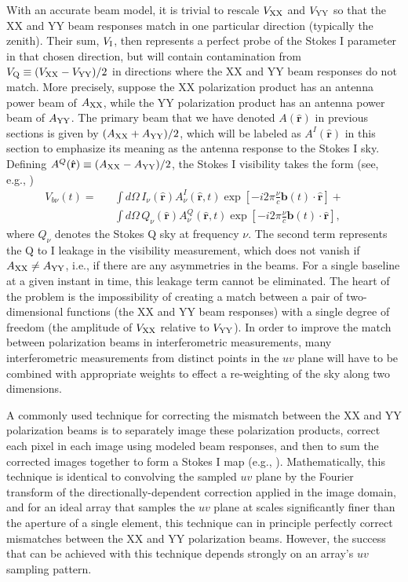 \documentclass[twocolumn,apj,numberedappendix]{emulateapj}
\newcommand{\rhat}{\hat{\mathbf{r}}}
\begin{document}
With an accurate beam model, it is trivial to rescale ${V_{\rm XX}}$ and ${V_{\rm YY}}$ 
so that the XX and YY beam responses match in one particular direction (typically the zenith).  Their sum, ${V_{\rm I}}$, then
represents a perfect probe of the Stokes I parameter in that chosen direction, but will contain contamination
from ${V_{\rm Q}}\equiv({V_{\rm XX}}-{V_{\rm YY}})/2$ in directions where the XX and YY beam responses do not match.
More precisely, suppose the XX polarization product has an antenna power beam of $A_{\rm XX}$, while the YY 
polarization product has an antenna power beam of $A_{\rm YY}$. The primary beam that we have denoted $A(\rhat)$ 
in previous sections is given by $(A_{\rm XX} + A_{\rm YY})/2$, which will be labeled as $A^I(\rhat)$ in this section to emphasize
its meaning as the antenna response to the Stokes I sky. Defining $A^Q(\rhat) \equiv (A_{\rm XX} - A_{\rm YY})/2$, the
Stokes I visibility takes the form (see, e.g., \citealt{moore_et_al2015})
\begin{eqnarray}
V_{b\nu}(t)= &&\int d\Omega \, {I_\nu(\rhat) A^I_\nu(\rhat,t) \exp \left[-i2\pi \frac{\nu}{c}  \mathbf{b}(t) \cdot \rhat\right]} + \nonumber \\
&& \int d\Omega \, {Q_\nu(\rhat) A^Q_\nu(\rhat,t) \exp \left[-i2\pi \frac{\nu}{c}  \mathbf{b}(t) \cdot \rhat\right]}, \qquad
\end{eqnarray}
where $Q_\nu$ denotes the Stokes Q sky at frequency $\nu$. The second term represents the Q to I leakage
in the visibility measurement, which does not vanish if $ A_{\rm XX} \neq A_{\rm YY}$, i.e., if there are
any asymmetries in the beams. For a single baseline at a given instant in time, this leakage term
cannot be eliminated. The heart of the problem is the impossibility of creating a match between a pair of two-dimensional functions (the
XX and YY beam responses) with a single degree of freedom (the amplitude of ${V_{\rm XX}}$ relative to ${V_{\rm YY}}$).  In order
to improve the match between polarization beams in interferometric measurements, many interferometric measurements
from distinct points in the $uv$ plane will have to be combined with appropriate weights to effect a re-weighting
of the sky along two dimensions.

A commonly used technique for correcting the mismatch between the XX and YY polarization beams is to separately
image these polarization products, correct each pixel in each image using modeled beam responses,
and then to sum the corrected images together to form a Stokes I map 
(e.g., \citealt{sullivan_et_al2012,bernardi_et_al2013,asad_et_al2015}).  Mathematically, this technique is identical to convolving the sampled
$uv$ plane by the Fourier transform of the directionally-dependent correction applied in the image domain, and for an ideal
array that samples the $uv$ plane at scales significantly finer than the aperture of a single element, this technique can
in principle perfectly correct mismatches between the XX and YY polarization beams.
However, the success that can be achieved with this technique depends strongly on an array's $uv$ sampling pattern.
\end{document}
